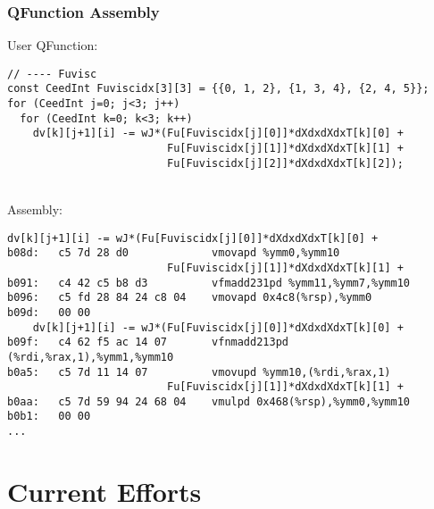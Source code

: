 \documentclass{beamer}
\begin{document}
\begin{frame}[fragile]
\begin{center}
\frametitle{QFunction Assembly}

User QFunction:
{\tiny
\begin{lstlisting}[style=C]
// ---- Fuvisc
const CeedInt Fuviscidx[3][3] = {{0, 1, 2}, {1, 3, 4}, {2, 4, 5}};
for (CeedInt j=0; j<3; j++)
  for (CeedInt k=0; k<3; k++)
    dv[k][j+1][i] -= wJ*(Fu[Fuviscidx[j][0]]*dXdxdXdxT[k][0] +
                         Fu[Fuviscidx[j][1]]*dXdxdXdxT[k][1] +
                         Fu[Fuviscidx[j][2]]*dXdxdXdxT[k][2]);
\end{lstlisting}
}

~\\

Assembly:
{\tiny
\begin{lstlisting}[style=assembly]
    dv[k][j+1][i] -= wJ*(Fu[Fuviscidx[j][0]]*dXdxdXdxT[k][0] +
b08d:	c5 7d 28 d0          	vmovapd %ymm0,%ymm10
                         Fu[Fuviscidx[j][1]]*dXdxdXdxT[k][1] +
b091:	c4 42 c5 b8 d3       	vfmadd231pd %ymm11,%ymm7,%ymm10
b096:	c5 fd 28 84 24 c8 04 	vmovapd 0x4c8(%rsp),%ymm0
b09d:	00 00 
    dv[k][j+1][i] -= wJ*(Fu[Fuviscidx[j][0]]*dXdxdXdxT[k][0] +
b09f:	c4 62 f5 ac 14 07    	vfnmadd213pd (%rdi,%rax,1),%ymm1,%ymm10
b0a5:	c5 7d 11 14 07       	vmovupd %ymm10,(%rdi,%rax,1)
                         Fu[Fuviscidx[j][1]]*dXdxdXdxT[k][1] +
b0aa:	c5 7d 59 94 24 68 04 	vmulpd 0x468(%rsp),%ymm0,%ymm10
b0b1:	00 00
...
\end{lstlisting}
}

\end{center}
\end{frame}

\section{Current Efforts}
\end{document}
